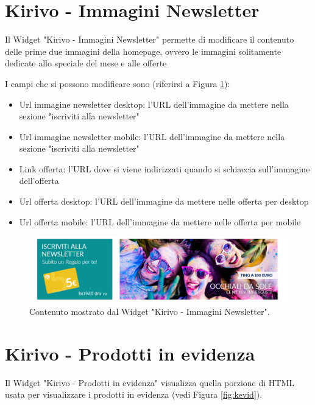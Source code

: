 
\newpage
\section{Kirivo - Immagini Newsletter}

Il Widget "Kirivo - Immagini Newsletter" permette di modificare il contenuto
delle prime due immagini della homepage, ovvero le immagini solitamente dedicate
allo speciale del mese e alle offerte 

I campi che si possono modificare sono (riferirsi a Figura \ref{fig:knews}):
\begin{itemize}
\item Url immagine newsletter desktop: l'URL dell'immagine da mettere nella sezione "iscriviti alla newsletter"
\item Url immagine newsletter mobile: l'URL dell'immagine da mettere nella sezione "iscriviti alla newsletter"
\item Link offerta: l'URL dove si viene indirizzati quando si schiaccia sull'immagine dell'offerta
\item Url offerta desktop: l'URL dell'immagine da mettere nelle offerta per desktop
\item Url offerta mobile: l'URL dell'immagine da mettere nelle offerta per mobile
\end{itemize}

\begin{figure}
  \includegraphics[width=\textwidth]{figure/knews.png}
  \caption{Contenuto mostrato dal Widget "Kirivo - Immagini Newsletter".}
  \label{fig:knews}
\end{figure}


\newpage
\section{Kirivo - Prodotti in evidenza}

Il Widget "Kirivo - Prodotti in evidenza" visualizza quella porzione di HTML usata
per visualizzare i prodotti in evidenza (vedi Figura \ref{fig:kevid}).

